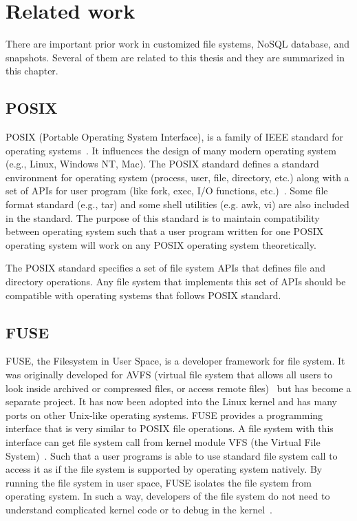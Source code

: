 \chapter{Related work}
\label{chap:related_work}

    There are important prior work in customized file systems, NoSQL database, and snapshots. Several of them are related to this thesis and they are summarized in this chapter.

\section{POSIX}

    POSIX (Portable Operating System Interface), is a family of IEEE standard for operating systems~\cite{posix_wiki}. It influences the design of many modern operating system (e.g., Linux, Windows NT, Mac). The POSIX standard defines a standard environment for operating system (process, user, file, directory, etc.) along with a set of APIs for user program (like fork, exec, I/O functions, etc.)~\cite{posix}. Some file format standard (e.g., tar) and some shell utilities (e.g. awk, vi) are also included in the standard. The purpose of this standard is to maintain compatibility between operating system such that a user program written for one POSIX operating system will work on any POSIX operating system theoretically. 

    The POSIX standard specifies a set of file system APIs that defines file and directory operations. Any file system that implements this set of APIs should be compatible with operating systems that follows POSIX standard.

\section{FUSE}

    FUSE, the Filesystem in User Space, is a developer framework for file system. It was originally developed for AVFS (virtual file system that allows all users
to look inside archived or compressed files, or access remote files)~\cite{avfs} but has become a separate project. It has now been adopted into the Linux kernel and has many ports on other Unix-like operating systems. FUSE provides a programming interface that is very similar to POSIX file operations. A file system with this interface can get file system call from kernel module VFS (the Virtual File System)~\cite{vfs}. Such that a user programs is able to use standard file system call to access it as if the file system is supported by operating system natively. By running the file system in user space, FUSE isolates the file system from operating system. In such a way, developers of the file system do not need to understand complicated kernel code or to debug in the kernel~\cite{fuse}.

